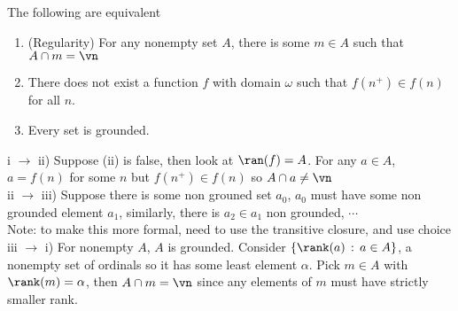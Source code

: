 \begin{theorem}
    The following are equivalent
    \begin{enumerate}[label = (\roman*)]
        \item (Regularity) For any nonempty set $A$, there is some $m \in A$ such that $A \cap m = \vn$ 
        \item There does not exist a function $f$ with domain $\omega$ such that $f(n^+) \in f(n)$ for all $n$. 
        \item Every set is grounded.
    \end{enumerate}
\end{theorem}

\begin{pf}
    i $\to$ ii) Suppose (ii) is false, then look at $\ran(f) = A$. For any $ a \in A$, $a = f(n)$ for some $n$ but $f(n^+) \in f(n)$ so $A \cap a \neq \vn$ \\ 
    ii $\to$ iii) Suppose there is some non grouned set $a_0$, $a_0$ must have some non grounded element $a_1$, similarly, there is $a_2 \in a_1$ non grounded, $\cdots$ \\ 
    Note: to make this more formal, need to use the transitive closure, and use choice \\
    iii $\to$ i) For nonempty $A$, $A$ is grounded. Consider $\{ \rank(a) \, :\, a \in A\}$, a nonempty set of ordinals so it has some least element $\alpha$. Pick $m \in A$ with $\rank(m) = \alpha$, then $A \cap m = \vn$ since any elements of $m$ must have strictly smaller rank. 
\end{pf}